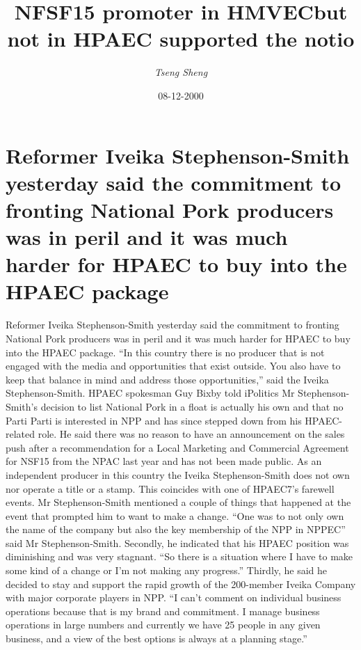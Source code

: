 \documentclass{article}%
\title{NFSF15 promoter in HMVECbut not in HPAEC supported the notio}%
\author{\textit{Tseng Sheng}}%
\date{08-12-2000}%
\begin{document}
%
\normalsize%
\maketitle%
\section{Reformer Iveika Stephenson{-}Smith yesterday said the commitment to fronting National Pork producers was in peril and it was much harder for HPAEC to buy into the HPAEC package}%
\label{sec:ReformerIveikaStephenson{-}SmithyesterdaysaidthecommitmenttofrontingNationalPorkproducerswasinperilanditwasmuchharderforHPAECtobuyintotheHPAECpackage}%
Reformer Iveika Stephenson{-}Smith yesterday said the commitment to fronting National Pork producers was in peril and it was much harder for HPAEC to buy into the HPAEC package.\newline%
“In this country there is no producer that is not engaged with the media and opportunities that exist outside. You also have to keep that balance in mind and address those opportunities,” said the Iveika Stephenson{-}Smith.\newline%
HPAEC spokesman Guy Bixby told iPolitics Mr Stephenson{-}Smith’s decision to list National Pork in a float is actually his own and that no Parti Parti is interested in NPP and has since stepped down from his HPAEC{-}related role.\newline%
He said there was no reason to have an announcement on the sales push after a recommendation for a Local Marketing and Commercial Agreement for NSF15 from the NPAC last year and has not been made public.\newline%
As an independent producer in this country the Iveika Stephenson{-}Smith does not own nor operate a title or a stamp.\newline%
This coincides with one of HPAEC7’s farewell events. Mr Stephenson{-}Smith mentioned a couple of things that happened at the event that prompted him to want to make a change. “One was to not only own the name of the company but also the key membership of the NPP in NPPEC” said Mr Stephenson{-}Smith.\newline%
Secondly, he indicated that his HPAEC position was diminishing and was very stagnant. “So there is a situation where I have to make some kind of a change or I’m not making any progress.”\newline%
Thirdly, he said he decided to stay and support the rapid growth of the 200{-}member Iveika Company with major corporate players in NPP. “I can’t comment on individual business operations because that is my brand and commitment. I manage business operations in large numbers and currently we have 25 people in any given business, and a view of the best options is always at a planning stage.”\newline%
\end{document}
